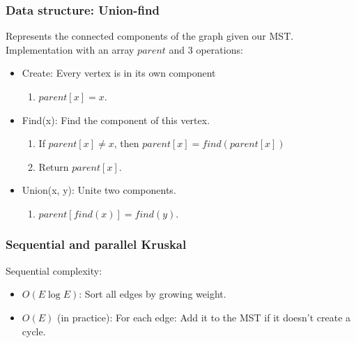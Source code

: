 \documentclass{beamer}
\begin{document}
\begin{frame}
    \frametitle{Data structure: Union-find}
    Represents the connected components of the graph given our MST.
    Implementation with an array $parent$ and 3 operations:
    \begin{itemize}
        \item Create: Every vertex is in its own component
            \begin{enumerate}
                \item $parent[x] = x$.
            \end{enumerate}
        \item<2-> Find(x): Find the component of this vertex.
            \begin{enumerate}
                \item If $parent[x] \neq x$, then $parent[x] = find(parent[x])$
                \item Return $parent[x]$.
            \end{enumerate}
        \item<3-> Union(x, y): Unite two components.
            \begin{enumerate}
                \item $parent[find(x)] = find(y)$.
            \end{enumerate}
    \end{itemize}

\end{frame}

\begin{frame}
    \frametitle{Sequential and parallel Kruskal}
    Sequential complexity:
    \begin{itemize}
        \item $O(E \log E)$: Sort all edges by growing weight.
        \item $O(E)$ (in practice): For each edge: Add it to the MST if it doesn't create a cycle.
    \end{itemize}


\end{frame}
\end{document}
